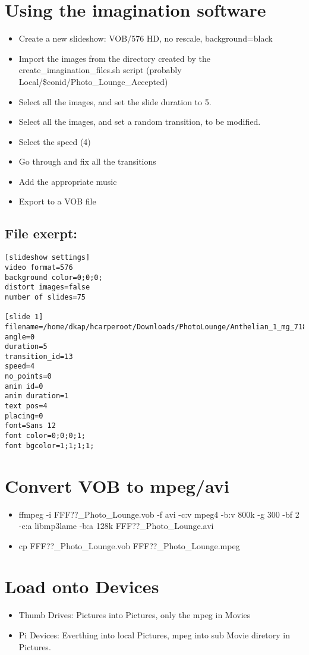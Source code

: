 \documentclass[captions=tablesignature]{scrartcl}
\begin{document}
\section{Using the imagination software}
\label{sec-6}

\begin{itemize}
\item Create a new slideshow: VOB/576 HD, no rescale, background=black
\item Import the images from the directory created by the
create\_imagination\_files.sh script (probably
Local/\$conid/Photo\_Lounge\_Accepted)
\item Select all the images, and set the slide duration to 5.
\item Select all the images, and set a random transition, to be
modified.
\item Select the speed (4)
\item Go through and fix all the transitions
\item Add the appropriate music
\item Export to a VOB file
\end{itemize}
\subsection{File exerpt:}
\label{sec-6-1}

\begin{verbatim}
[slideshow settings]
video format=576
background color=0;0;0;
distort images=false
number of slides=75

[slide 1]
filename=/home/dkap/hcarperoot/Downloads/PhotoLounge/Anthelian_1_mg_7182a.jpg
angle=0
duration=5
transition_id=13
speed=4
no_points=0
anim id=0
anim duration=1
text pos=4
placing=0
font=Sans 12
font color=0;0;0;1;
font bgcolor=1;1;1;1;
\end{verbatim}

\section{Convert VOB to mpeg/avi}
\label{sec-7}

\begin{itemize}
\item ffmpeg -i FFF??\_Photo\_Lounge.vob -f avi -c:v mpeg4 -b:v 800k -g 300 -bf 2 -c:a libmp3lame -b:a 128k FFF??\_Photo\_Lounge.avi
\item cp FFF??\_Photo\_Lounge.vob FFF??\_Photo\_Lounge.mpeg
\end{itemize}

\section{Load onto Devices}
\label{sec-8}

\begin{itemize}
\item Thumb Drives:  Pictures into Pictures, only the mpeg in Movies
\item Pi Devices: Everthing into local Pictures, mpeg into sub Movie diretory in Pictures.
\end{itemize}
\end{document}
